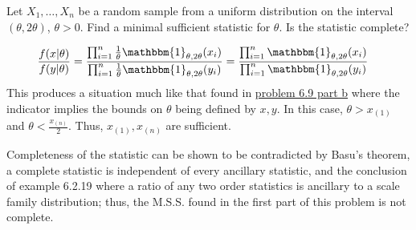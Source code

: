 \documentclass[12pt,letterpaper]{exam}
\begin{document}
\begin{questions}
\begin{solution}
	\end{solution}
	
	\setcounter{question}{22}
	\question 
	Let \(X_1, \ldots, X_n\) be a random sample from a uniform distribution on the interval 
	\((\theta, 2\theta)\), \(\theta > 0\). Find a minimal sufficient statistic for \(\theta\). 
	Is the statistic complete?
	
	\begin{solution}
		\begin{align*}
			\frac{f(x|\theta)}{f(y|\theta)}
			&= \frac{\prod_{i=1}^{n} \frac{1}{\theta} \mathbbm{1}_{\theta,2\theta}(x_i) }{ \prod_{i=1}^{n} \frac{1}{\theta} \mathbbm{1}_{\theta,2\theta}(y_i)}
			= \frac{\prod_{i=1}^{n} \mathbbm{1}_{\theta,2\theta}(x_i) }{ \prod_{i=1}^{n} \mathbbm{1}_{\theta,2\theta}(y_i)}
		\end{align*}
		This produces a situation much like that found in \hyperref[prob:9,sec:b]{problem 6.9 part b} where the indicator implies the bounds on 
		\(\theta\) being defined by \(x,y\). In this case, \(\theta > x_{(1)}\) and \(\theta < \frac{x_{(n)}}{2}\). 
		Thus, \(x_{(1)}, x_{(n)}\) are sufficient.
		
		Completeness of the statistic can be shown to be contradicted by Basu's theorem,
		a complete statistic is independent of every ancillary statistic,
		and the conclusion of example 6.2.19 where a ratio of any two order statistics is ancillary to a scale family distribution;
		thus, the M.S.S. found in the first part of this problem is not complete.
	\end{solution}

\end{questions}
\end{document}
